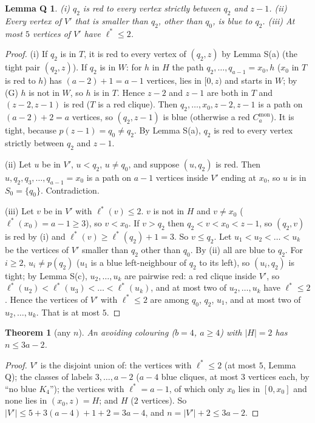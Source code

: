 \documentclass[11pt]{article}
\newcommand{\Cmon}[1]{C_{#1}^{\mathrm{mon}}}
\theoremstyle{plain}
\newtheorem{theorem}{Theorem}
\newtheorem*{lemmaQ}{Lemma Q}
\theoremstyle{remark}
\begin{document}
\begin{lemmaQ}
(i) $q_2$ is red to every vertex strictly between $q_2$ and $z-1$.
(ii) Every vertex of $V'$ that is smaller than $q_2$, other than $q_0$, is blue to $q_2$.
(iii) At most $5$ vertices of $V'$ have $\ell^* \leq 2$.
\end{lemmaQ}

\begin{proof}
(i) If $q_2$ is in $T$, it is red to every vertex of $(q_2, z)$ by Lemma S(a) (the tight pair $(q_2, z)$). If
$q_2$ is in $W$: for $h$ in $H$ the path $q_2, \dots, q_{a-1} = x_0, h$ ($x_0$ in $T$ is red to $h$) has
$(a-2) + 1 = a-1$ vertices, lies in $[0, z)$ and starts in $W$; by (G) $h$ is not in $W$, so $h$ is in $T$. Hence
$z-2$ and $z-1$ are both in $T$ and $(z-2, z-1)$ is red ($T$ is a red clique). Then
$q_2, \dots, x_0, z-2, z-1$ is a path on $(a-2) + 2 = a$ vertices, so $(q_2, z-1)$ is blue (otherwise a red
$\Cmon{a}$). It is tight, because $p(z-1) = q_0 \neq q_2$. By Lemma S(a), $q_2$ is red to every vertex strictly
between $q_2$ and $z-1$.

(ii) Let $u$ be in $V'$, $u < q_2$, $u \neq q_0$, and suppose $(u, q_2)$ is red. Then
$u, q_2, q_3, \dots, q_{a-1} = x_0$ is a path on $a-1$ vertices inside $V'$ ending at $x_0$, so $u$ is in
$S_0 = \{q_0\}$. Contradiction.

(iii) Let $v$ be in $V'$ with $\ell^*(v) \leq 2$. $v$ is not in $H$ and $v \neq x_0$ ($\ell^*(x_0) = a-1 \geq 3$),
so $v < x_0$. If $v > q_2$ then $q_2 < v < x_0 < z-1$, so $(q_2, v)$ is red by (i) and
$\ell^*(v) \geq \ell^*(q_2) + 1 = 3$. So $v \leq q_2$. Let $u_1 < u_2 < \dots < u_k$ be the vertices of $V'$
smaller than $q_2$ other than $q_0$. By (ii) all are blue to $q_2$. For $i \geq 2$, $u_i \neq p(q_2)$ ($u_1$ is a
blue left-neighbour of $q_2$ to its left), so $(u_i, q_2)$ is tight; by Lemma S(c), $u_2, \dots, u_k$ are pairwise
red: a red clique inside $V'$, so $\ell^*(u_2) < \ell^*(u_3) < \dots < \ell^*(u_k)$, and at most two of
$u_2, \dots, u_k$ have $\ell^* \leq 2$. Hence the vertices of $V'$ with $\ell^* \leq 2$ are among $q_0$, $q_2$,
$u_1$, and at most two of $u_2, \dots, u_k$. That is at most $5$.
\end{proof}

\begin{theorem}[any $n$]\label{thm:close}
An avoiding colouring ($b = 4$, $a \geq 4$) with $|H| = 2$ has $n \leq 3a-2$.
\end{theorem}

\begin{proof}
$V'$ is the disjoint union of: the vertices with $\ell^* \leq 2$ (at most $5$, Lemma Q); the classes of labels
$3, \dots, a-2$ ($a-4$ blue cliques, at most $3$ vertices each, by ``no blue $K_4$''); the vertices with
$\ell^* = a-1$, of which only $x_0$ lies in $[0, x_0]$ and none lies in $(x_0, z) = H$; and $H$ ($2$ vertices). So
$|V'| \leq 5 + 3(a-4) + 1 + 2 = 3a-4$, and $n = |V'| + 2 \leq 3a-2$.
\end{proof}
\end{document}
